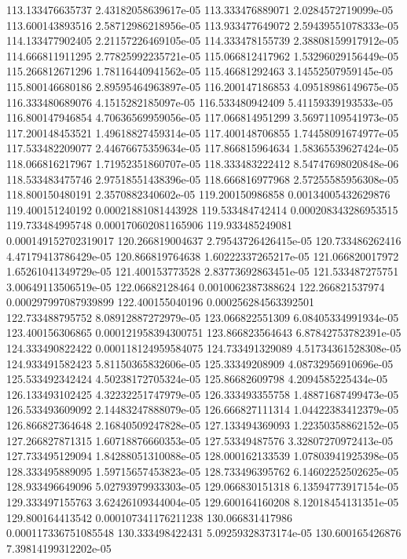 {113.133476635737 2.43182058639617e-05
113.333476889071 2.0284572719099e-05
113.600143893516 2.58712986218956e-05
113.933477649072 2.59439551078333e-05
114.133477902405 2.21157226469105e-05
114.333478155739 2.38808159917912e-05
114.666811911295 2.77825992235721e-05
115.066812417962 1.53296029156449e-05
115.266812671296 1.78116440941562e-05
115.46681292463 3.14552507959145e-05
115.800146680186 2.89595464963897e-05
116.200147186853 4.09518986149675e-05
116.333480689076 4.1515282185097e-05
116.533480942409 5.41159339193533e-05
116.800147946854 4.70636569959056e-05
117.066814951299 3.56971109541973e-05
117.200148453521 1.49618827459314e-05
117.400148706855 1.74458091674977e-05
117.533482209077 2.44676675359634e-05
117.866815964634 1.58365539627424e-05
118.066816217967 1.71952351860707e-05
118.333483222412 8.54747698020848e-06
118.533483475746 2.97518551438396e-05
118.666816977968 2.57255585956308e-05
118.800150480191 2.3570882340602e-05
119.200150986858 0.00134005432629876
119.400151240192 0.00021881081443928
119.533484742414 0.000208343286953515
119.733484995748 0.000170602081165906
119.933485249081 0.000149152702319017
120.266819004637 2.79543726426415e-05
120.733486262416 4.47179413786429e-05
120.866819764638 1.60222337265217e-05
121.066820017972 1.65261041349729e-05
121.400153773528 2.83773692863451e-05
121.533487275751 3.00649113506519e-05
122.06682128464 0.0010062387388624
122.266821537974 0.000297997087939899
122.400155040196 0.000256284563392501
122.733488795752 8.08912887272979e-05
123.066822551309 6.08405334991934e-05
123.400156306865 0.000121958394300751
123.866823564643 6.87842753782391e-05
124.333490822422 0.000118124959584075
124.733491329089 4.51734361528308e-05
124.933491582423 5.81150365832606e-05
125.33349208909 4.08732956910696e-05
125.533492342424 4.50238172705324e-05
125.86682609798 4.2094585225434e-05
126.133493102425 4.32232251747979e-05
126.333493355758 1.48871687499473e-05
126.533493609092 2.14483247888079e-05
126.666827111314 1.04422383412379e-05
126.866827364648 2.16840509247828e-05
127.133494369093 1.22350358862152e-05
127.266827871315 1.60718876660353e-05
127.53349487576 3.32807270972413e-05
127.733495129094 1.84288051310088e-05
128.000162133539 1.07803941925398e-05
128.333495889095 1.59715657453823e-05
128.733496395762 6.14602252502625e-05
128.933496649096 5.02793979933303e-05
129.066830151318 6.13594773917154e-05
129.333497155763 3.62426109344004e-05
129.600164160208 8.12018454131351e-05
129.800164413542 0.000107341176211238
130.066831417986 0.000117336751085548
130.333498422431 5.09259328373174e-05
130.600165426876 7.39814199312202e-05
}

